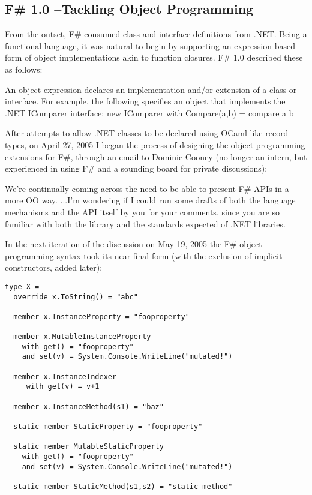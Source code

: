 \documentclass[acmsmall,review]{acmart}\settopmatter{printfolios=true,printccs=false,printacmref=false}
\begin{document}
\subsection*{F\# 1.0 –Tackling Object Programming}

From the outset, F\# consumed class and interface definitions from .NET. Being a functional language, it was natural to begin by supporting an expression-based form of object implementations akin to function closures.  F\# 1.0 described these as follows: 
\begin{verbquote}
An object expression declares an implementation and/or extension of a class or interface. For example, the following specifies an object that implements the .NET IComparer interface:
    { new IComparer with Compare(a,b) = compare a b }
\end{verbquote}

After attempts to allow .NET classes to be declared using OCaml-like record types, on April 27, 2005 I began the process of designing the object-programming extensions for F\#, through an email to Dominic Cooney (no longer an intern, but experienced in using F\# and a sounding board for private discussions):

\begin{verbquote}
We're continually coming across the need to be able to present F\# APIs in a more OO way.  ...I'm wondering if I could run some drafts of both the language mechanisms and the API itself by you for your comments, since you are so familiar with both the library and the standards expected of .NET libraries. 
\end{verbquote}

In the next iteration of the discussion on May 19, 2005 the F\# object programming syntax took its near-final form (with the exclusion of implicit constructors, added later):
\begin{verbatim}
type X =
  override x.ToString() = "abc"

  member x.InstanceProperty = "fooproperty"

  member x.MutableInstanceProperty
    with get() = "fooproperty"
    and set(v) = System.Console.WriteLine("mutated!")
    
  member x.InstanceIndexer
     with get(v) = v+1
     
  member x.InstanceMethod(s1) = "baz"

  static member StaticProperty = "fooproperty"

  static member MutableStaticProperty
    with get() = "fooproperty"
    and set(v) = System.Console.WriteLine("mutated!")
    
  static member StaticMethod(s1,s2) = "static method"
\end{verbatim}
\end{document}
